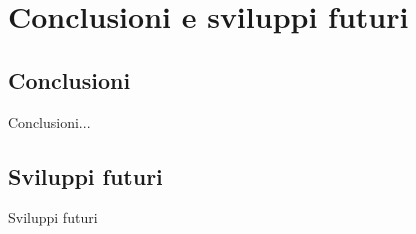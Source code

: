 \chapter{Conclusioni e sviluppi futuri}

\section{Conclusioni}
	Conclusioni...

\section{Sviluppi futuri}
	Sviluppi futuri